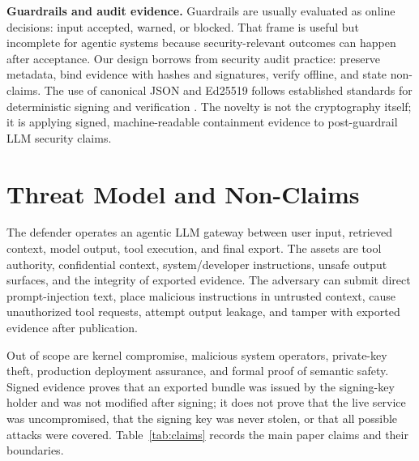 \documentclass[sigconf,anonymous,review]{acmart}
\begin{document}
\textbf{Guardrails and audit evidence.} Guardrails are usually evaluated as online decisions: input accepted, warned, or blocked. That frame is useful but incomplete for agentic systems because security-relevant outcomes can happen after acceptance. Our design borrows from security audit practice: preserve metadata, bind evidence with hashes and signatures, verify offline, and state non-claims. The use of canonical JSON and Ed25519 follows established standards for deterministic signing and verification \cite{rfc8785,rfc8032}. The novelty is not the cryptography itself; it is applying signed, machine-readable containment evidence to post-guardrail LLM security claims.

\section{Threat Model and Non-Claims}

The defender operates an agentic LLM gateway between user input, retrieved context, model output, tool execution, and final export. The assets are tool authority, confidential context, system/developer instructions, unsafe output surfaces, and the integrity of exported evidence. The adversary can submit direct prompt-injection text, place malicious instructions in untrusted context, cause unauthorized tool requests, attempt output leakage, and tamper with exported evidence after publication.

Out of scope are kernel compromise, malicious system operators, private-key theft, production deployment assurance, and formal proof of semantic safety. Signed evidence proves that an exported bundle was issued by the signing-key holder and was not modified after signing; it does not prove that the live service was uncompromised, that the signing key was never stolen, or that all possible attacks were covered. Table~\ref{tab:claims} records the main paper claims and their boundaries.
\end{document}

